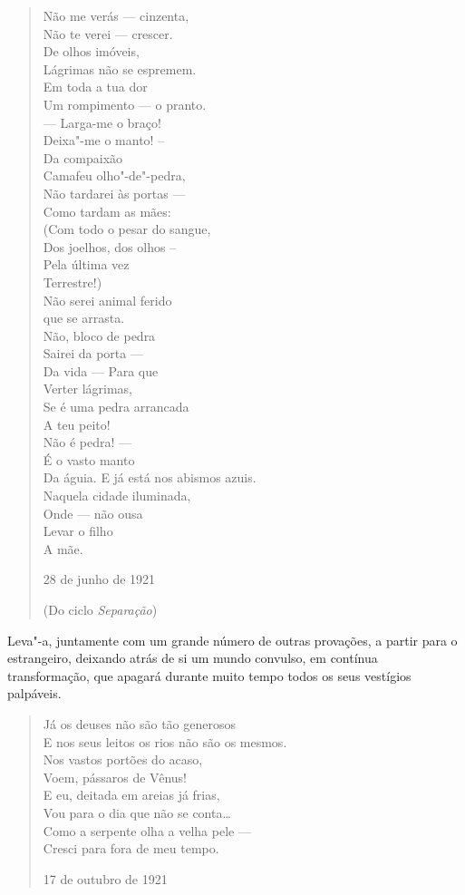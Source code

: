 \begin{verse}
Não me verás --- cinzenta, \\
Não te verei --- crescer. \\
De olhos imóveis, \\
Lágrimas não se espremem. \\[8pt]
Em toda a tua dor \\
Um rompimento --- o pranto. \\
--- Larga-me o braço! \\
Deixa"-me o manto! -- \\[8pt]
Da compaixão \\
Camafeu olho"-de"-pedra, \\
Não tardarei às portas --- \\
Como tardam as mães: \\[8pt]
(Com todo o pesar do sangue, \\
Dos joelhos, dos olhos -- \\
Pela última vez \\
Terrestre!) \\
Não serei animal ferido \\
que se arrasta. \\[8pt]
Não, bloco de pedra \\
Sairei da porta --- \\
Da vida --- Para que \\
Verter lágrimas, \\
Se é uma pedra arrancada \\
A teu peito! \\[8pt]
Não é pedra! --- \\
É o vasto manto \\
Da águia. E já está nos abismos azuis. \\
Naquela cidade iluminada, \\
Onde --- não ousa \\
Levar o filho \\
A mãe.

28 de junho de 1921

(Do ciclo \emph{Separação})

\end{verse}

Leva"-a, juntamente com um grande número de outras provações, a
partir para o estrangeiro, deixando atrás de si um mundo convulso,
em contínua transformação, que apagará durante muito tempo todos os
seus vestígios palpáveis.

\begin{verse}
Já os deuses não são tão generosos \\
E nos seus leitos os rios não são os mesmos. \\
Nos vastos portões do acaso, \\
Voem, pássaros de Vênus! \\[8pt]
E eu, deitada em areias já frias, \\
Vou para o dia que não se conta\ldots{} \\
Como a serpente olha a velha pele --- \\
Cresci para fora de meu tempo. 

17 de outubro de 1921

\end{verse}

